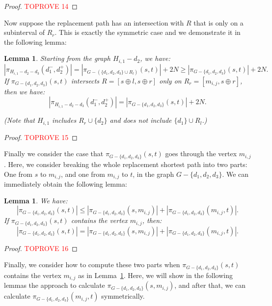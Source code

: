 \documentclass[11pt]{article}
\theoremstyle{plain}
\newtheorem{lemma}[theorem]{Lemma}
\theoremstyle{definition}
\newcommand{\set}[1]{\{ #1 \}}
\newcommand{\og}[3]{\pi_{G-#3}\left(#1,#2\right)}
\begin{document}
\begin{proof}\textcolor{red}{TOPROVE 14}\end{proof}

Now suppose the replacement path has an intersection with $R$ that is only on a subinterval of $R_r$. This is exactly the symmetric case and we demonstrate it in the following lemma:

\begin{lemma}\label{2edgecase3}
    Starting from the graph $H_{i,1} - d_2$, we have:
    \[|\pi_{H_{i,1}-d_2-d_3}(d_1^-,d_2^+)| = |\og{s}{t}{(\set{d_1, d_2, d_3}\cup R_l)}| + 2N \geq |\og{s}{t}{\set{d_1, d_2, d_3}}| + 2N.\]
    If $\og{s}{t}{\set{d_1, d_2, d_3}}$ intersects $R = [s \oplus l, s \oplus r]$ only on $R_r = [m_{i,j},s \oplus r]$, then we have:
    \[|\pi_{H_{i,1}-d_2-d_3}(d_1^-,d_2^+)| = |\og{s}{t}{\set{d_1, d_2, d_3}}| + 2N.\]
    
    (Note that $H_{i,1}$ includes $R_r \cup \set{d_2}$ and does not include $\set{d_1} \cup R_l$.)
\end{lemma}

\begin{proof}\textcolor{red}{TOPROVE 15}\end{proof}

Finally we consider the case that $\og{s}{t}{\set{d_1, d_2, d_3}}$ goes through the vertex $m_{i,j}$. Here, we consider breaking the whole replacement shortest path into two parts: One from $s$ to $m_{i,j}$, and one from $m_{i,j}$ to $t$, in the graph $G-\set{d_1, d_2, d_3}$. We can immediately obtain the following lemma:

\begin{lemma}\label{2edgecase4}
    We have:
    \[|\og{s}{t}{\set{d_1, d_2, d_3}}| \leq |\og{s}{m_{i,j}}{\set{d_1, d_2, d_3}}| + |\og{m_{i,j}}{t}{\set{d_1, d_2, d_3}}|.\]
    If $\og{s}{t}{\set{d_1, d_2, d_3}}$ contains the vertex $m_{i,j}$, then: 
    \[|\og{s}{t}{\set{d_1, d_2, d_3}}| = |\og{s}{m_{i,j}}{\set{d_1, d_2, d_3}}| + |\og{m_{i,j}}{t}{\set{d_1, d_2, d_3}}|.\]
\end{lemma}

\begin{proof}\textcolor{red}{TOPROVE 16}\end{proof}

Finally, we consider how to compute these two parts when $\og{s}{t}{\set{d_1, d_2, d_3}}$ contains the vertex $m_{i,j}$ as in Lemma~\ref{2edgecase4}. Here, we will show in the following lemmas the approach to calculate $\og{s}{m_{i,j}}{\set{d_1, d_2, d_3}}$, and after that, we can calculate $\og{m_{i,j}}{t}{\set{d_1, d_2, d_3}}$ symmetrically.
\end{document}
